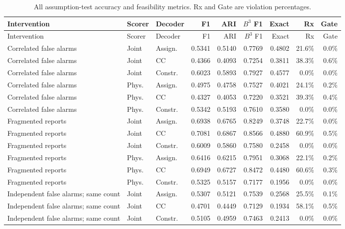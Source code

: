 \small\setlength{\tabcolsep}{3pt}
\begin{longtable}{@{}p{3.8cm}llrrrrrr@{}}
\caption{All assumption-test accuracy and feasibility metrics. Rx and Gate are violation percentages.}\label{tab:all_risk_metrics}\\
\toprule Intervention & Scorer & Decoder & F1 & ARI & $B^3$ F1 & Exact & Rx & Gate\\\midrule\endfirsthead
\toprule Intervention & Scorer & Decoder & F1 & ARI & $B^3$ F1 & Exact & Rx & Gate\\\midrule\endhead
\bottomrule\endfoot
Correlated false alarms & Joint & Assign. & 0.5341 & 0.5140 & 0.7769 & 0.4802 & 21.6\% & 0.0\% \\
Correlated false alarms & Joint & CC & 0.4366 & 0.4093 & 0.7254 & 0.3811 & 38.3\% & 0.6\% \\
Correlated false alarms & Joint & Constr. & 0.6023 & 0.5893 & 0.7927 & 0.4577 & 0.0\% & 0.0\% \\
Correlated false alarms & Phys. & Assign. & 0.4975 & 0.4758 & 0.7527 & 0.4021 & 24.1\% & 0.2\% \\
Correlated false alarms & Phys. & CC & 0.4327 & 0.4053 & 0.7220 & 0.3521 & 39.3\% & 0.4\% \\
Correlated false alarms & Phys. & Constr. & 0.5342 & 0.5193 & 0.7610 & 0.3580 & 0.0\% & 0.0\% \\
Fragmented reports & Joint & Assign. & 0.6938 & 0.6765 & 0.8249 & 0.3748 & 22.7\% & 0.0\% \\
Fragmented reports & Joint & CC & 0.7081 & 0.6867 & 0.8566 & 0.4880 & 60.9\% & 0.5\% \\
Fragmented reports & Joint & Constr. & 0.6009 & 0.5860 & 0.7580 & 0.2458 & 0.0\% & 0.0\% \\
Fragmented reports & Phys. & Assign. & 0.6416 & 0.6215 & 0.7951 & 0.3068 & 22.1\% & 0.2\% \\
Fragmented reports & Phys. & CC & 0.6949 & 0.6727 & 0.8472 & 0.4480 & 60.6\% & 0.3\% \\
Fragmented reports & Phys. & Constr. & 0.5325 & 0.5157 & 0.7177 & 0.1956 & 0.0\% & 0.0\% \\
Independent false alarms; same count & Joint & Assign. & 0.5307 & 0.5121 & 0.7539 & 0.2568 & 25.5\% & 0.1\% \\
Independent false alarms; same count & Joint & CC & 0.4701 & 0.4449 & 0.7129 & 0.1934 & 58.1\% & 0.5\% \\
Independent false alarms; same count & Joint & Constr. & 0.5105 & 0.4959 & 0.7463 & 0.2413 & 0.0\% & 0.0\% \\

\end{longtable}

